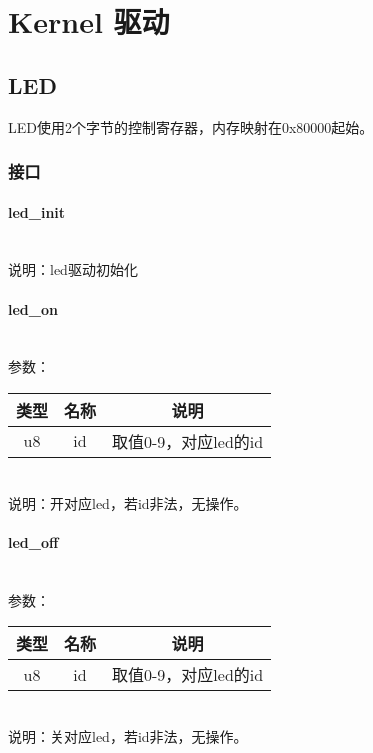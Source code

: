 %
%
%
%
%
%
%
%

\chapter{Kernel 驱动}
\section{LED}
LED使用2个字节的控制寄存器，内存映射在0x80000起始。
\subsection{接口}

\subsubsection{led\_init}
\\
说明：led驱动初始化

\subsubsection{led\_on}
\\
参数：\\
\begin{tabular}{|c|c|c|}
    \hline
    类型 & 名称 & 说明\\\hline
    u8 & id & 取值0-9，对应led的id\\\hline
\end{tabular}\\
说明：开对应led，若id非法，无操作。

\subsubsection{led\_off}
\\
参数：\\
\begin{tabular}{|c|c|c|}
    \hline
    类型 & 名称 & 说明\\\hline
    u8 & id & 取值0-9，对应led的id\\\hline
\end{tabular}\\
说明：关对应led，若id非法，无操作。

